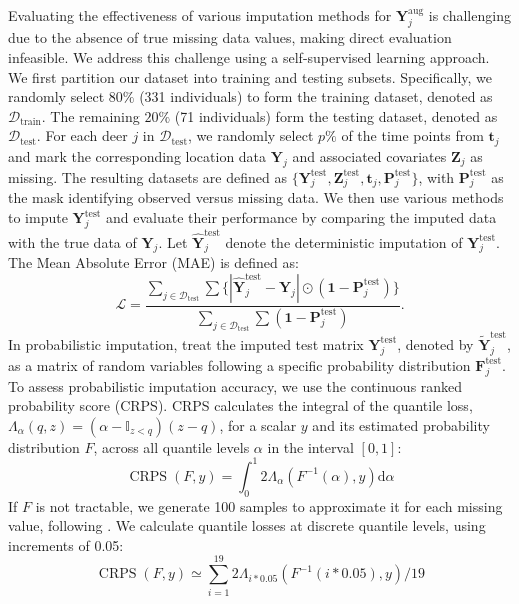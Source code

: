 \documentclass[11pt]{article}
\begin{document}
Evaluating the effectiveness of various imputation methods for $\bm{Y}_j^{\mathrm{aug}}$ is challenging due to the absence of true missing data values, making direct evaluation infeasible. We address this challenge using a self-supervised learning approach. We first partition our dataset into training and testing subsets. Specifically, we randomly select $80\%$ (331 individuals) to form the training dataset, denoted as $\mathcal{D}_{\mathrm{train}}$. The remaining $20\%$ (71 individuals) form the testing dataset, denoted as $\mathcal{D}_{\mathrm{test}}$. For each deer $j$ in $\mathcal{D}_{\mathrm{test}}$, we randomly select $p\%$ of the time points from $\bm{t}_j$ and mark the corresponding location data $\bm{Y}_j$ and associated covariates $\bm{Z}_j$ as missing. The resulting datasets are defined as $\{\bm{Y}_j^{\mathrm{test}},\bm{Z}_j^{\mathrm{test}}, \bm{t}_j, \bm{P}_j^{\mathrm{test}}\}$, with $\bm{P}_j^{\mathrm{test}}$ as the mask identifying observed versus missing data. We then use various methods to impute $\bm{Y}_j^{\mathrm{test}}$ and evaluate their performance by comparing the imputed data with the true data of $\bm{Y}_j$. Let $\hat{\bm{Y}}_j^{\mathrm{test}}$ denote the deterministic imputation of $\bm{Y}_j^{\mathrm{test}}$. The Mean Absolute Error (MAE) is defined as:
\begin{equation}
	\mathcal{L}=\frac{\sum_{j\in \mathcal{D}_{\mathrm{test}}}\sum \big\{|\hat{\bm{Y}}_j^{\mathrm{test}}-\bm{Y}_j|\odot (\bm{1}-\bm{P}_j^{\mathrm{test}})\big\}}{\sum_{j\in \mathcal{D}_{\mathrm{test}}}\sum (\bm{1}-\bm{P}_j^{\mathrm{test}})}.
\end{equation} 
In probabilistic imputation, treat the imputed test matrix $\bm{Y}_j^{\mathrm{test}}$, denoted by $\tilde{\bm{Y}}_j^{\mathrm{test}}$, as a matrix of random variables following a specific probability distribution $\bm{F}_j^{\mathrm{test}}$. To assess probabilistic imputation accuracy, we use the continuous ranked probability score (CRPS)\citep{matheson1976scoring}. CRPS calculates the integral of the quantile loss, $\Lambda_\alpha(q, z) = (\alpha - \mathbb{I}_{z < q})(z - q)$, for a scalar $y$ and its estimated probability distribution $F$, across all quantile levels $\alpha$ in the interval $[0,1]$: \begin{equation}
    \operatorname{CRPS}\left(F, y\right)=\int_0^1 2 \Lambda_\alpha\left(F^{-1}(\alpha), y\right) \mathrm{d} \alpha
\end{equation}
If $F$ is not tractable, we generate 100 samples to approximate it for each missing value, following \citet{tashiro2021csdi}. We calculate quantile losses at discrete quantile levels, using increments of 0.05: \begin{equation}
    \operatorname{CRPS}\left(F, y\right) \simeq \sum_{i=1}^{19} 2 \Lambda_{i * 0.05}\left(F^{-1}(i * 0.05), y\right) / 19
\end{equation}
\end{document}
